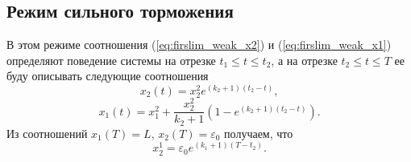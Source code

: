 \subsection{Режим сильного торможения}

В этом режиме соотношения (\ref{eq:firslim_weak_x2}) и (\ref{eq:firslim_weak_x1}) определяют поведение системы на отрезке $t_1 \leqslant t \leqslant t_2$, а на отрезке $t_2 \leqslant t \leqslant T$ ее буду описывать следующие соотношения
\begin{equation}\label{eq:strong_x2}
        x_2(t) = x_2^2e^{(k_2+1)(t_2-t)},
\end{equation}
\begin{equation}\label{eq:strong_x1}
        x_1(t) =x_1^2 + \frac{x_2^2}{k_2+1}\left(1 - e^{(k_2+1)(t_2-t)}\right).
\end{equation}
Из соотношений $x_1(T) = L$, $x_2(T) = \varepsilon_0$ получаем, что
$$
        x_2^1 = \varepsilon_0e^{(k_1+1)(T - t_2)}.
$$

